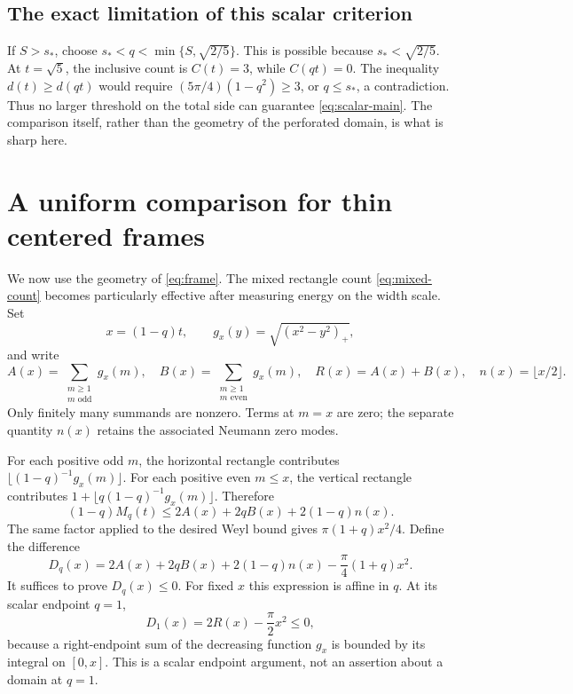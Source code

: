 \documentclass[11pt,reqno]{amsart}
\numberwithin{equation}{section}
\newcommand{\sstar}{s_*}
\begin{document}
\subsection*{The exact limitation of this scalar criterion}

If $S>\sstar$, choose
$\sstar<q<\min\{S,\sqrt{2/5}\}$. This is possible because
$\sstar<\sqrt{2/5}$. At $t=\sqrt5$, the inclusive count is
$C(t)=3$, while $C(qt)=0$. The inequality
$d(t)\ge d(qt)$ would require
$(5\pi/4)(1-q^2)\ge3$, or $q\le\sstar$, a contradiction.
Thus no larger threshold on the total side can guarantee
\eqref{eq:scalar-main}. The comparison itself, rather than the
geometry of the perforated domain, is what is sharp here.

\section{A uniform comparison for thin centered frames}\label{sec:thin}

We now use the geometry of \eqref{eq:frame}. The mixed rectangle
count \eqref{eq:mixed-count} becomes particularly effective after
measuring energy on the width scale. Set
\[
 x=(1-q)t,\qquad g_x(y)=\sqrt{(x^2-y^2)_+},
\]
and write
\begin{equation}\label{eq:AB}
 A(x)=\sum_{\substack{m\ge1\\m\text{ odd}}}g_x(m),
 \quad B(x)=\sum_{\substack{m\ge1\\m\text{ even}}}g_x(m),
 \quad R(x)=A(x)+B(x),\quad n(x)=\lfloor x/2\rfloor.
\end{equation}
Only finitely many summands are nonzero. Terms at $m=x$ are
zero; the separate quantity $n(x)$ retains the associated
Neumann zero modes.

For each positive odd $m$, the horizontal rectangle contributes
$\lfloor(1-q)^{-1}g_x(m)\rfloor$. For each positive even $m\le x$,
the vertical rectangle contributes
$1+\lfloor q(1-q)^{-1}g_x(m)\rfloor$. Therefore
\begin{equation}\label{eq:mixed-scalar}
 (1-q)M_q(t)\le2A(x)+2qB(x)+2(1-q)n(x).
\end{equation}
The same factor applied to the desired Weyl bound gives
$\pi(1+q)x^2/4$. Define the difference
\begin{equation}\label{eq:Dq}
 D_q(x)=2A(x)+2qB(x)+2(1-q)n(x)
                  -\frac\pi4(1+q)x^2.
\end{equation}
It suffices to prove $D_q(x)\le0$. For fixed $x$ this expression
is affine in $q$. At its scalar endpoint $q=1$,
\begin{equation}\label{eq:D1}
 D_1(x)=2R(x)-\frac\pi2x^2\le0,
\end{equation}
because a right-endpoint sum of the decreasing function $g_x$
is bounded by its integral on $[0,x]$. This is a scalar
endpoint argument, not an assertion about a domain at $q=1$.
\end{document}
